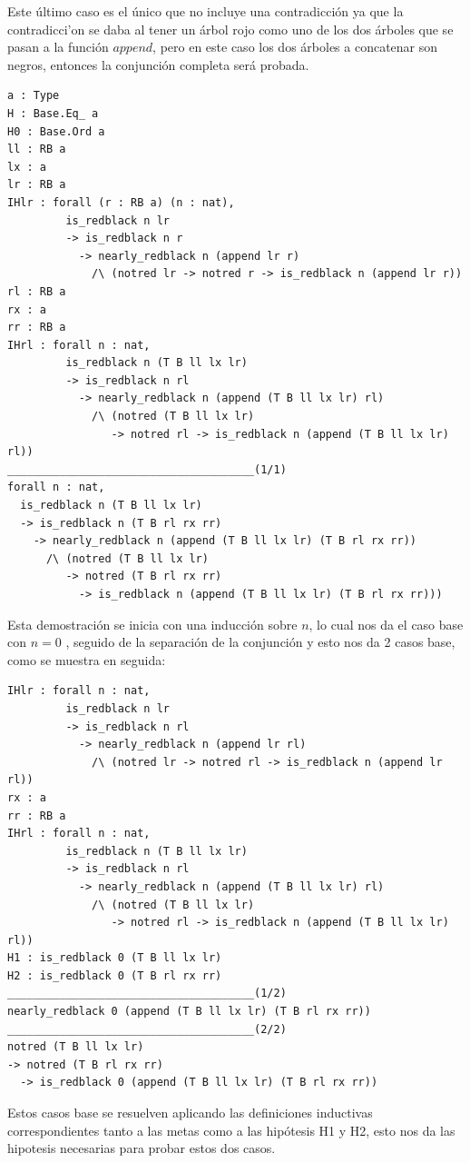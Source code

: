 \documentclass[8pt,leqno,pdflatex,spanish]{book}
\theoremstyle{plain}
\theoremstyle{definition}
\theoremstyle{remark}
\begin{document}
Este \'ultimo caso es el \'unico que no incluye una contradicci\'on ya que la contradicci'on se 
daba al tener un \'arbol rojo como uno de los dos \'arboles que se pasan a la funci\'on $append$, 
pero en este caso los dos \'arboles a concatenar son negros, entonces la conjunci\'on completa 
ser\'a probada.

\begin{verbatim}
a : Type
H : Base.Eq_ a
H0 : Base.Ord a
ll : RB a
lx : a
lr : RB a
IHlr : forall (r : RB a) (n : nat),
         is_redblack n lr
         -> is_redblack n r
           -> nearly_redblack n (append lr r)
             /\ (notred lr -> notred r -> is_redblack n (append lr r))
rl : RB a
rx : a
rr : RB a
IHrl : forall n : nat,
         is_redblack n (T B ll lx lr)
         -> is_redblack n rl
           -> nearly_redblack n (append (T B ll lx lr) rl)
             /\ (notred (T B ll lx lr)
                -> notred rl -> is_redblack n (append (T B ll lx lr) rl))
______________________________________(1/1)
forall n : nat,
  is_redblack n (T B ll lx lr)
  -> is_redblack n (T B rl rx rr)
    -> nearly_redblack n (append (T B ll lx lr) (T B rl rx rr))
      /\ (notred (T B ll lx lr)
         -> notred (T B rl rx rr)
           -> is_redblack n (append (T B ll lx lr) (T B rl rx rr)))
\end{verbatim}

Esta demostraci\'on se inicia con una inducci\'on sobre $n$, lo cual nos da el caso base con $n=0$
, seguido de la separaci\'on de la conjunci\'on y esto nos da 2 casos base, como se muestra en
seguida:

\begin{verbatim}
IHlr : forall n : nat,
         is_redblack n lr
         -> is_redblack n rl
           -> nearly_redblack n (append lr rl)
             /\ (notred lr -> notred rl -> is_redblack n (append lr rl))
rx : a
rr : RB a
IHrl : forall n : nat,
         is_redblack n (T B ll lx lr)
         -> is_redblack n rl
           -> nearly_redblack n (append (T B ll lx lr) rl)
             /\ (notred (T B ll lx lr)
                -> notred rl -> is_redblack n (append (T B ll lx lr) rl))
H1 : is_redblack 0 (T B ll lx lr)
H2 : is_redblack 0 (T B rl rx rr)
______________________________________(1/2)
nearly_redblack 0 (append (T B ll lx lr) (T B rl rx rr))
______________________________________(2/2)
notred (T B ll lx lr)
-> notred (T B rl rx rr)
  -> is_redblack 0 (append (T B ll lx lr) (T B rl rx rr))
\end{verbatim}

Estos casos base se resuelven aplicando las definiciones inductivas correspondientes tanto a las 
metas como a las hip\'otesis H1 y H2, esto nos da las hipotesis necesarias para probar estos dos 
casos.
\end{document}
